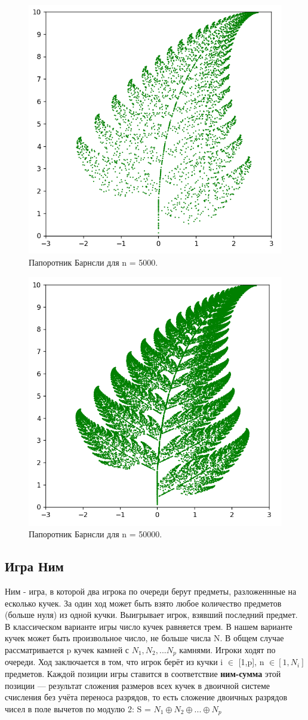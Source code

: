 \documentclass[11pt,a4paper,final]{article} %
\begin{document}
\begin{figure}[H]
	\centering
	\includegraphics[width=0.6\linewidth]{img/fern2.png}
	\caption{Папоротник Барнсли для n = 5000.}
	\label{fig:fern5000}
\end{figure}

\begin{figure}[H]
	\centering
	\includegraphics[width=0.6\linewidth]{img/fern3.png}
	\caption{Папоротник Барнсли для n = 50000.}
	\label{fig:fern50000}
\end{figure}


\subsection{Игра Ним}

\par Ним - игра, в которой два игрока по очереди берут предметы, разложеннные на есколько кучек. За один ход может быть взято любое количество предметов (больше нуля) из одной кучки. Выигрывает игрок, взявший последний предмет. В классическом варианте игры число кучек равняется трем. В нашем варианте кучек может быть произвольное число, не больше числа N.
В общем случае рассматривается p кучек камней с $N_1, N_2,...N_p$ камнями. Игроки ходят по очереди. Ход заключается в том, что игрок берёт из кучки i $\in$ [1,p], n $\in [1,N_i]$ предметов. Каждой позиции игры ставится в соответствие \textbf{ним-сумма} этой позиции — результат сложения размеров всех кучек в двоичной системе счисления без учёта переноса разрядов, то есть сложение двоичных разрядов чисел в поле вычетов по модулю 2: S = $N_1 \oplus N_2 \oplus ... \oplus N_p$
\end{document}
